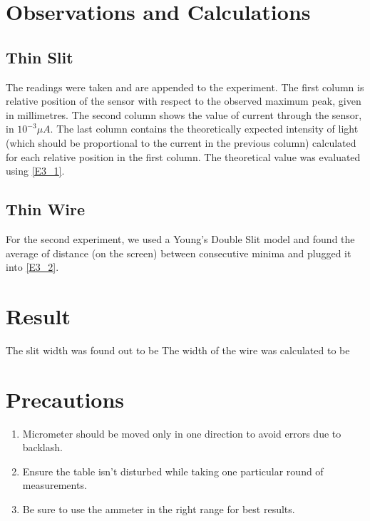 \section{Observations and Calculations}	
	\subsection{Thin Slit}
	The readings were taken and are appended to the experiment. The first column is relative position of the sensor with respect to the observed maximum peak, given in millimetres. The second column shows the value of current through the sensor, in $10^{-3} \mu A$. The last column contains the theoretically expected intensity of light (which should be proportional to the current in the previous column) calculated for each relative position in the first column. The theoretical value was evaluated using \autoref{E3_1}.
	
	\subsection{Thin Wire}
	For the second experiment, we used a Young's Double Slit model and found the average of distance (on the screen) between consecutive minima and plugged it into \autoref{E3_2}.


\section{Result}
	The slit width was found out to be
	The width of the wire was calculated to be 
\section{Precautions}
	\begin{enumerate}		
		\item Micrometer should be moved only in one direction to avoid errors due to backlash.
		\item Ensure the table isn't disturbed while taking one particular round of measurements.
		\item Be sure to use the ammeter in the right range for best results.
	\end{enumerate}